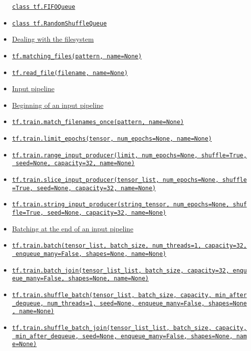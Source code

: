 \begin{itemize}
  \protect\hyperlink{FIFOQueue}{\texttt{class\ tf.FIFOQueue}}
\item
  \protect\hyperlink{RandomShuffleQueue}{\texttt{class\ tf.RandomShuffleQueue}}
\item
  \protect\hyperlink{AUTOGENERATED-dealing-with-the-filesystem}{Dealing
  with the filesystem}
\item
  \protect\hyperlink{matchingux5ffiles}{\texttt{tf.matching\_files(pattern,\ name=None)}}
\item
  \protect\hyperlink{readux5ffile}{\texttt{tf.read\_file(filename,\ name=None)}}
\item
  \protect\hyperlink{AUTOGENERATED-input-pipeline}{Input pipeline}
\item
  \protect\hyperlink{AUTOGENERATED-beginning-of-an-input-pipeline}{Beginning
  of an input pipeline}
\item
  \protect\hyperlink{matchux5ffilenamesux5fonce}{\texttt{tf.train.match\_filenames\_once(pattern,\ name=None)}}
\item
  \protect\hyperlink{limitux5fepochs}{\texttt{tf.train.limit\_epochs(tensor,\ num\_epochs=None,\ name=None)}}
\item
  \protect\hyperlink{rangeux5finputux5fproducer}{\texttt{tf.train.range\_input\_producer(limit,\ num\_epochs=None,\ shuffle=True,\ seed=None,\ capacity=32,\ name=None)}}
\item
  \protect\hyperlink{sliceux5finputux5fproducer}{\texttt{tf.train.slice\_input\_producer(tensor\_list,\ num\_epochs=None,\ shuffle=True,\ seed=None,\ capacity=32,\ name=None)}}
\item
  \protect\hyperlink{stringux5finputux5fproducer}{\texttt{tf.train.string\_input\_producer(string\_tensor,\ num\_epochs=None,\ shuffle=True,\ seed=None,\ capacity=32,\ name=None)}}
\item
  \protect\hyperlink{AUTOGENERATED-batching-at-the-end-of-an-input-pipeline}{Batching
  at the end of an input pipeline}
\item
  \protect\hyperlink{batch}{\texttt{tf.train.batch(tensor\_list,\ batch\_size,\ num\_threads=1,\ capacity=32,\ enqueue\_many=False,\ shapes=None,\ name=None)}}
\item
  \protect\hyperlink{batchux5fjoin}{\texttt{tf.train.batch\_join(tensor\_list\_list,\ batch\_size,\ capacity=32,\ enqueue\_many=False,\ shapes=None,\ name=None)}}
\item
  \protect\hyperlink{shuffleux5fbatch}{\texttt{tf.train.shuffle\_batch(tensor\_list,\ batch\_size,\ capacity,\ min\_after\_dequeue,\ num\_threads=1,\ seed=None,\ enqueue\_many=False,\ shapes=None,\ name=None)}}
\item
  \protect\hyperlink{shuffleux5fbatchux5fjoin}{\texttt{tf.train.shuffle\_batch\_join(tensor\_list\_list,\ batch\_size,\ capacity,\ min\_after\_dequeue,\ seed=None,\ enqueue\_many=False,\ shapes=None,\ name=None)}}
\end{itemize}

